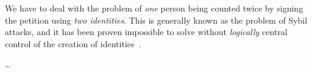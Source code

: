 We have to deal with the problem of \emph{one} person being counted twice by 
signing the petition using \emph{two identities}.
This is generally known as the problem of Sybil attacks, and it has been proven 
impossible to solve without \emph{logically} central control of the creation of 
identities~\cite{SybilAttack}.

\dots
